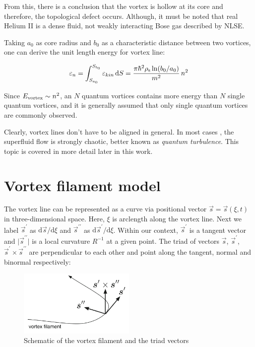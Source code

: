From this, there is a conclusion that the vortex is hollow at its core and therefore, the topological defect occurs. Although, it must be noted that real Helium II is a dense fluid, not weakly interacting Bose gas described by NLSE.

Taking $a_0$ as core radius and $b_0$ as a characteristic distance between two vortices, one can derive the unit length energy for vortex line:

\begin{equation}
\varepsilon_n
= \int_{S_{a_0}}^{S_{b_0}} \varepsilon_{kin}\,\mathrm{d}S
= \frac{\pi \hbar^2 \rho_{\mathrm{s}} \ln(b_0/a_0)}{m^2}\, n^2
\label{eps_n}
\end{equation}

Since $E_{\mathrm{vortex}} \sim n^2$, an $N$ quantum vortices contains more energy than $N$ single quantum vortices, and it is generally assumed that only single quantum vortices are commonly observed.

Clearly, vortex lines don't have to be aligned in general. In most cases , the superfluid flow is strongly chaotic, better known as \textit{quantum turbulence}. This topic is covered in more detail later in this work.


\section{Vortex filament model}

The vortex line can be represented as a curve via positional vector $\vec{s} = \vec{s}(\xi, t)$ in three-dimensional space. Here, $\xi$ is arclength along the vortex line. Next we label $\vec{s}^{\prime}$ as $\text{d}\vec{s} / \text{d} \xi$ and $\vec{s}^{\prime\prime}$ as $\text{d}\vec{s}^{\prime} / \text{d} \xi$.
Within our context, $\vec{s}^{\prime}$ is a tangent vector and $\vert \vec{s}^{\prime\prime} \vert$ is a local curvature $R^{-1}$ at a given point. The triad of vectors $\vec{s}$, $\vec{s}^{\prime}$, $\vec{s}^{\prime} \times \vec{s}^{\prime\prime}$ are perpendicular to each other and point along the tangent, normal and binormal respectively:

\begin{figure}[h]
	\centering
	\includegraphics[width=0.5\textwidth]{graphics/theory/filament}
	\caption{Schematic of the vortex filament and the triad vectors}
	\label{filament}
\end{figure}


